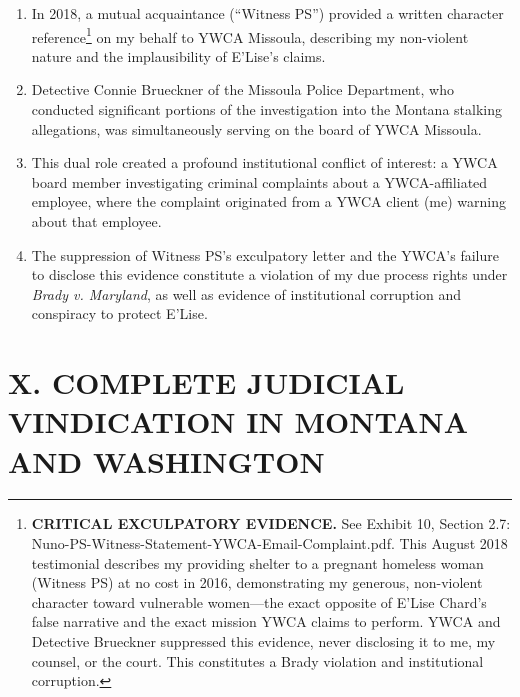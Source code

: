 \documentclass[12pt,letterpaper]{article}
\begin{document}
\begin{enumerate}

\item In 2018, a mutual acquaintance (``Witness PS'') provided a written character reference\footnote{\textbf{CRITICAL EXCULPATORY EVIDENCE.} See Exhibit 10, Section 2.7: Nuno-PS-Witness-Statement-YWCA-Email-Complaint.pdf. This August 2018 testimonial describes my providing shelter to a pregnant homeless woman (Witness PS) at no cost in 2016, demonstrating my generous, non-violent character toward vulnerable women---the exact opposite of E'Lise Chard's false narrative and the exact mission YWCA claims to perform. YWCA and Detective Brueckner suppressed this evidence, never disclosing it to me, my counsel, or the court. This constitutes a Brady violation and institutional corruption.} on my behalf to YWCA Missoula, describing my non-violent nature and the implausibility of E'Lise's claims.

\item Detective Connie Brueckner of the Missoula Police Department, who conducted significant portions of the investigation into the Montana stalking allegations, was simultaneously serving on the board of YWCA Missoula.

\item This dual role created a profound institutional conflict of interest: a YWCA board member investigating criminal complaints about a YWCA-affiliated employee, where the complaint originated from a YWCA client (me) warning about that employee.

\item The suppression of Witness PS's exculpatory letter and the YWCA's failure to disclose this evidence constitute a violation of my due process rights under \textit{Brady v. Maryland}, as well as evidence of institutional corruption and conspiracy to protect E'Lise.

\end{enumerate}

\section*{X. COMPLETE JUDICIAL VINDICATION IN MONTANA AND WASHINGTON}
\end{document}
